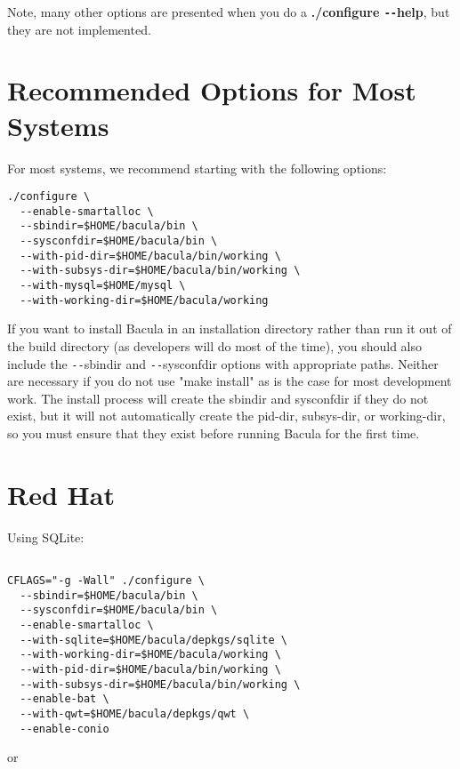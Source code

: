 Note, many other options are presented when you do a {\bf ./configure
\verb:--:help}, but they are not implemented.

\section{Recommended Options for Most Systems}

For most systems, we recommend starting with the following options: 

\footnotesize
\begin{verbatim}
./configure \
  --enable-smartalloc \
  --sbindir=$HOME/bacula/bin \
  --sysconfdir=$HOME/bacula/bin \
  --with-pid-dir=$HOME/bacula/bin/working \
  --with-subsys-dir=$HOME/bacula/bin/working \
  --with-mysql=$HOME/mysql \
  --with-working-dir=$HOME/bacula/working
\end{verbatim}
\normalsize

If you want to install Bacula in an installation directory rather than run it
out of the build directory (as developers will do most of the time), you
should also include the \verb:--:sbindir and \verb:--:sysconfdir options with appropriate
paths. Neither are necessary if you do not use "make install" as is the case
for most development work. The install process will create the sbindir and
sysconfdir if they do not exist, but it will not automatically create the
pid-dir, subsys-dir, or working-dir, so you must ensure that they exist before
running Bacula for the first time.

\section{Red Hat}
\index[general]{Red Hat}

Using SQLite: 

\footnotesize
\begin{verbatim}
 
CFLAGS="-g -Wall" ./configure \
  --sbindir=$HOME/bacula/bin \
  --sysconfdir=$HOME/bacula/bin \
  --enable-smartalloc \
  --with-sqlite=$HOME/bacula/depkgs/sqlite \
  --with-working-dir=$HOME/bacula/working \
  --with-pid-dir=$HOME/bacula/bin/working \
  --with-subsys-dir=$HOME/bacula/bin/working \
  --enable-bat \
  --with-qwt=$HOME/bacula/depkgs/qwt \
  --enable-conio
\end{verbatim}
\normalsize

or 

